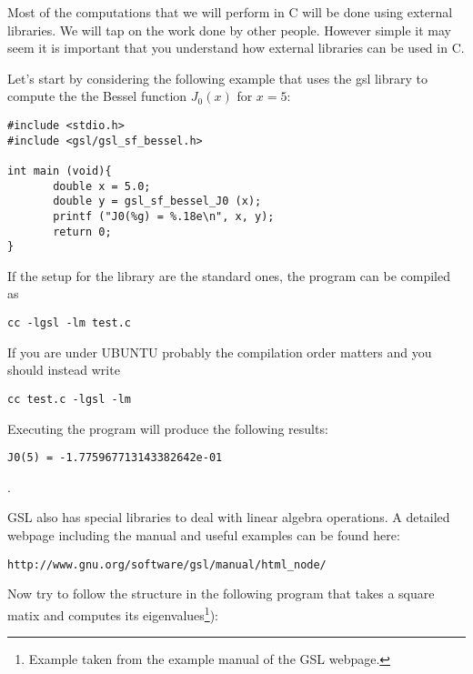 \documentclass{article}
\begin{document}
Most of the computations that we will perform in C will be done using external libraries. We will tap on the work done by other people. However simple it may seem it is important that you understand how external libraries can be used in C.

Let's start by considering the following example that uses the gsl library to compute the the Bessel function $J_{0}(x)$ for $x=5$:

\begin{verbatim}
#include <stdio.h>
#include <gsl/gsl_sf_bessel.h>
     
int main (void){
       double x = 5.0;
       double y = gsl_sf_bessel_J0 (x);
       printf ("J0(%g) = %.18e\n", x, y);
       return 0;
}
\end{verbatim}

If the setup for the library are the standard ones, the program can be compiled as

\begin{verbatim}
cc -lgsl -lm test.c 
\end{verbatim}



If you are under UBUNTU probably the compilation order matters and you should instead write

\begin{verbatim}
cc test.c -lgsl -lm 
\end{verbatim}

Executing the program will produce the following results:

\begin{verbatim}
J0(5) = -1.775967713143382642e-01
\end{verbatim}.


GSL also has special libraries to deal with linear algebra operations. A detailed webpage including the manual and useful examples can be found here:

\begin{verbatim}
http://www.gnu.org/software/gsl/manual/html_node/
\end{verbatim}

Now try to follow the structure in the following program that takes a square matix and computes its eigenvalues\footnote{Example taken from the example manual of the GSL webpage.}):



\end{document}
